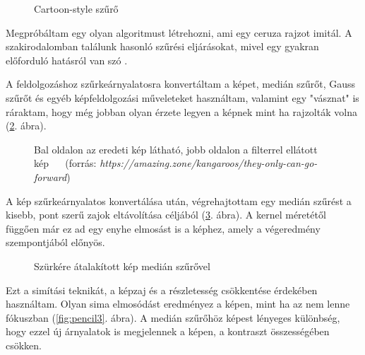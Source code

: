\begin{figure}[h!]
\centering
{}
\caption{Cartoon-style szűrő } 
\label{fig:cartoon5}
\end{figure}




Megpróbáltam egy olyan algoritmust létrehozni, ami egy ceruza rajzot imitál. A szakirodalomban találunk hasonló szűrési eljárásokat, mivel egy gyakran előforduló hatásról van szó \cite{beyeler2}.

A feldolgozáshoz szűrkeárnyalatosra konvertáltam a képet, medián szűrőt, Gauss szűrőt és egyéb képfeldolgozási műveleteket használtam, valamint egy "vásznat" is ráraktam, hogy még jobban olyan érzete legyen a képnek mint ha rajzolták volna (\ref{fig:pencil1}. ábra).

\begin{figure}[h!]
\centering
{}
\caption{Bal oldalon az eredeti kép látható, jobb oldalon a filterrel ellátott kép $\quad$ (forrás: \textit{https://amazing.zone/kangaroos/they-only-can-go-forward})} 
\label{fig:pencil1}
\end{figure}

\newpage


A kép szűrkeárnyalatos konvertálása után, végrehajtottam egy medián szűrést a kisebb, pont szerű zajok eltávolítása céljából (\ref{fig:pencil2}. ábra). A kernel méretétől függően már ez ad egy enyhe elmosást is a képhez, amely a végeredmény szempontjából előnyös.

\begin{figure}[h!]
\centering
{}
\caption{Szürkére átalakított kép medián szűrővel} 
\label{fig:pencil2}
\end{figure}


Ezt a simítási teknikát, a képzaj  és a részletesség csökkentése érdekében használtam. Olyan sima elmosódást eredményez a képen, mint ha az nem lenne fókuszban (\ref{fig:pencil3}. ábra). A medián szűrőhöz képest lényeges különbség, hogy ezzel új árnyalatok is megjelennek a képen, a kontraszt összességében csökken.

